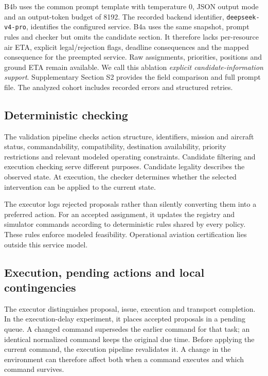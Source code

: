 \documentclass[]{interact}
\theoremstyle{plain}
\theoremstyle{definition}
\theoremstyle{remark}
\begin{document}
B4b uses the common prompt template with temperature 0, JSON output mode and an output-token budget of 8192. The recorded backend identifier, \nolinkurl{deepseek-v4-pro}, identifies the configured service. B4a uses the same snapshot, prompt rules and checker but omits the candidate section. It therefore lacks per-resource air ETA, explicit legal/rejection flags, deadline consequences and the mapped consequence for the preempted service. Raw assignments, priorities, positions and ground ETA remain available. We call this ablation \emph{explicit candidate-information support}. Supplementary Section S2 provides the field comparison and full prompt file. The analyzed cohort includes recorded errors and structured retries.

\subsection{Deterministic checking}

The validation pipeline checks action structure, identifiers, mission and aircraft status, commandability, compatibility, destination availability, priority restrictions and relevant modeled operating constraints. Candidate filtering and execution checking serve different purposes. Candidate legality describes the observed state. At execution, the checker determines whether the selected intervention can be applied to the current state.

The executor logs rejected proposals rather than silently converting them into a preferred action. For an accepted assignment, it updates the registry and simulator commands according to deterministic rules shared by every policy. These rules enforce modeled feasibility. Operational aviation certification lies outside this service model.

\subsection{Execution, pending actions and local contingencies}

The executor distinguishes proposal, issue, execution and transport completion. In the execution-delay experiment, it places accepted proposals in a pending queue. A changed command supersedes the earlier command for that task; an identical normalized command keeps the original due time. Before applying the current command, the execution pipeline revalidates it. A change in the environment can therefore affect both when a command executes and which command survives.
\end{document}
